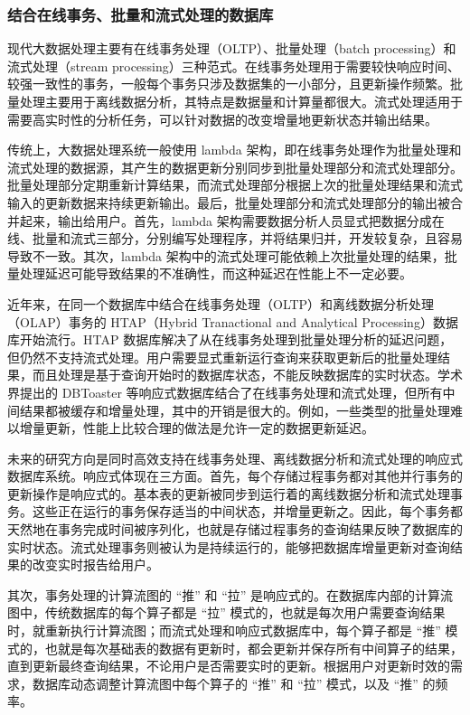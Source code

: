 \subsubsection{结合在线事务、批量和流式处理的数据库}
\label{future:reactdb}

现代大数据处理主要有在线事务处理（OLTP）、批量处理（batch processing）和流式处理（stream processing）三种范式。在线事务处理用于需要较快响应时间、较强一致性的事务，一般每个事务只涉及数据集的一小部分，且更新操作频繁。批量处理主要用于离线数据分析，其特点是数据量和计算量都很大。流式处理适用于需要高实时性的分析任务，可以针对数据的改变增量地更新状态并输出结果。

传统上，大数据处理系统一般使用 lambda 架构，即在线事务处理作为批量处理和流式处理的数据源，其产生的数据更新分别同步到批量处理部分和流式处理部分。批量处理部分定期重新计算结果，而流式处理部分根据上次的批量处理结果和流式输入的更新数据来持续更新输出。最后，批量处理部分和流式处理部分的输出被合并起来，输出给用户。首先，lambda 架构需要数据分析人员显式把数据分成在线、批量和流式三部分，分别编写处理程序，并将结果归并，开发较复杂，且容易导致不一致。其次，lambda 架构中的流式处理可能依赖上次批量处理的结果，批量处理延迟可能导致结果的不准确性，而这种延迟在性能上不一定必要。

近年来，在同一个数据库中结合在线事务处理（OLTP）和离线数据分析处理（OLAP）事务的 HTAP（Hybrid Tranactional and Analytical Processing）数据库开始流行。HTAP 数据库解决了从在线事务处理到批量处理分析的延迟问题，但仍然不支持流式处理。用户需要显式重新运行查询来获取更新后的批量处理结果，而且处理是基于查询开始时的数据库状态，不能反映数据库的实时状态。学术界提出的 DBToaster 等响应式数据库结合了在线事务处理和流式处理，但所有中间结果都被缓存和增量处理，其中的开销是很大的。例如，一些类型的批量处理难以增量更新，性能上比较合理的做法是允许一定的数据更新延迟。

未来的研究方向是同时高效支持在线事务处理、离线数据分析和流式处理的响应式数据库系统。响应式体现在三方面。首先，每个存储过程事务都对其他并行事务的更新操作是响应式的。基本表的更新被同步到运行着的离线数据分析和流式处理事务。这些正在运行的事务保存适当的中间状态，并增量更新之。因此，每个事务都天然地在事务完成时间被序列化，也就是存储过程事务的查询结果反映了数据库的实时状态。流式处理事务则被认为是持续运行的，能够把数据库增量更新对查询结果的改变实时报告给用户。

其次，事务处理的计算流图的 ``推'' 和 ``拉'' 是响应式的。在数据库内部的计算流图中，传统数据库的每个算子都是 ``拉'' 模式的，也就是每次用户需要查询结果时，就重新执行计算流图；而流式处理和响应式数据库中，每个算子都是 ``推'' 模式的，也就是每次基础表的数据有更新时，都会更新并保存所有中间算子的结果，直到更新最终查询结果，不论用户是否需要实时的更新。根据用户对更新时效的需求，数据库动态调整计算流图中每个算子的 ``推'' 和 ``拉'' 模式，以及 ``推'' 的频率。

